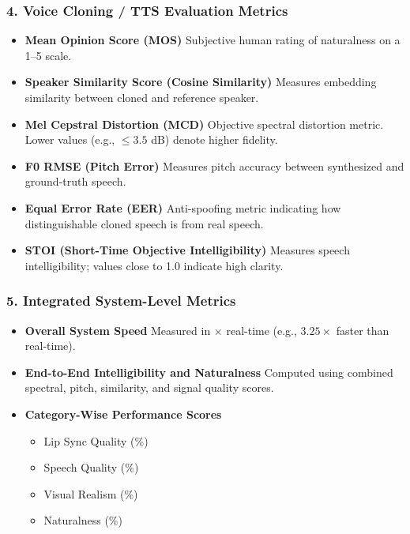 \documentclass[12pt,oneside]{report}
\begin{document}
\subsubsection*{4. Voice Cloning / TTS Evaluation Metrics}

\begin{itemize}
    \item \textbf{Mean Opinion Score (MOS)}  
    Subjective human rating of naturalness on a 1–5 scale.
    \item \textbf{Speaker Similarity Score (Cosine Similarity)}  
    Measures embedding similarity between cloned and reference speaker.
    \item \textbf{Mel Cepstral Distortion (MCD)}  
    Objective spectral distortion metric.  
    Lower values (e.g., $\leq 3.5$ dB) denote higher fidelity.
    \item \textbf{F0 RMSE (Pitch Error)}  
    Measures pitch accuracy between synthesized and ground-truth speech.
    \item \textbf{Equal Error Rate (EER)}  
    Anti-spoofing metric indicating how distinguishable cloned speech is from real speech.
    \item \textbf{STOI (Short-Time Objective Intelligibility)}  
    Measures speech intelligibility; values close to 1.0 indicate high clarity.
\end{itemize}

\subsubsection*{5. Integrated System-Level Metrics}

\begin{itemize}
    \item \textbf{Overall System Speed}  
    Measured in $\times$ real-time (e.g., $3.25\times$ faster than real-time).
    \item \textbf{End-to-End Intelligibility and Naturalness}  
    Computed using combined spectral, pitch, similarity, and signal quality scores.
    \item \textbf{Category-Wise Performance Scores}  
    \begin{itemize}
        \item Lip Sync Quality (\%)
        \item Speech Quality (\%)
        \item Visual Realism (\%)
        \item Naturalness (\%)
    \end{itemize}
\end{itemize}
\end{document}
